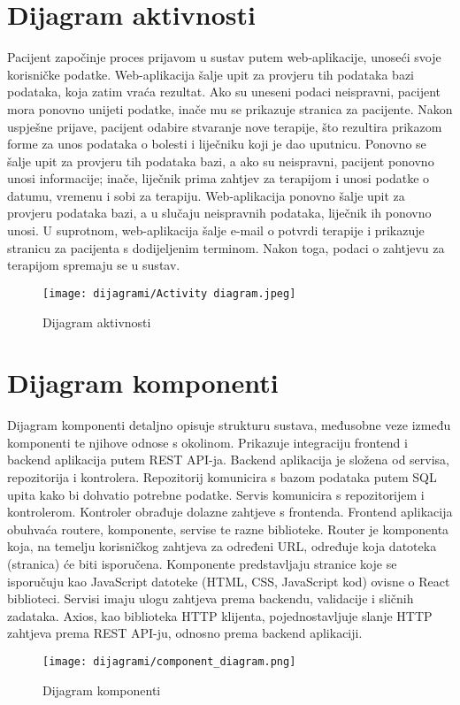 \eject 

\section{Dijagram aktivnosti}

Pacijent započinje proces prijavom u sustav putem web-aplikacije, unoseći svoje korisničke podatke. Web-aplikacija šalje upit za provjeru tih podataka bazi podataka, koja zatim vraća rezultat. Ako su uneseni podaci neispravni, pacijent mora ponovno unijeti podatke, inače mu se prikazuje stranica za pacijente. Nakon uspješne prijave, pacijent odabire stvaranje nove terapije, što rezultira prikazom forme za unos podataka o bolesti i liječniku koji je dao uputnicu. Ponovno se šalje upit za provjeru tih podataka bazi, a ako su neispravni, pacijent ponovno unosi informacije; inače, liječnik prima zahtjev za terapijom i unosi podatke o datumu, vremenu i sobi za terapiju. Web-aplikacija ponovno šalje upit za provjeru podataka bazi, a u slučaju neispravnih podataka, liječnik ih ponovno unosi. U suprotnom, web-aplikacija šalje e-mail o potvrdi terapije i prikazuje stranicu za pacijenta s dodijeljenim terminom. Nakon toga, podaci o zahtjevu za terapijom spremaju se u sustav.

\begin{figure}[H]
	\texttt{[image: dijagrami/Activity diagram.jpeg]}
	\centering
	\caption{Dijagram aktivnosti}
	\label{fig:ActivityDiagram}
\end{figure}

\eject
\section{Dijagram komponenti}

Dijagram komponenti detaljno opisuje strukturu sustava, međusobne veze između komponenti te njihove odnose s okolinom. Prikazuje integraciju frontend i backend aplikacija putem REST API-ja. Backend aplikacija je složena od servisa, repozitorija i kontrolera. Repozitorij komunicira s bazom podataka putem SQL upita kako bi dohvatio potrebne podatke. Servis komunicira s repozitorijem i kontrolerom. Kontroler obrađuje dolazne zahtjeve s frontenda. Frontend aplikacija obuhvaća routere, komponente, servise te razne biblioteke. Router je komponenta koja, na temelju korisničkog zahtjeva za određeni URL, određuje koja datoteka (stranica) će biti isporučena. Komponente predstavljaju stranice koje se isporučuju kao JavaScript datoteke (HTML, CSS, JavaScript kod) ovisne o React biblioteci. Servisi imaju ulogu zahtjeva prema backendu, validacije i sličnih zadataka. Axios, kao biblioteka HTTP klijenta, pojednostavljuje slanje HTTP zahtjeva prema REST API-ju, odnosno prema backend aplikaciji.

\begin{figure}[H]
	\texttt{[image: dijagrami/component\_diagram.png]}
	\centering
	\caption{Dijagram komponenti}
	\label{fig:component_diagram}
\end{figure}